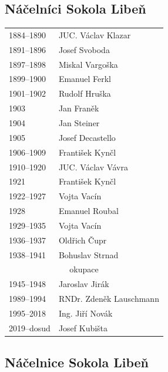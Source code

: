 \documentclass[a5paper, 11pt, twoside]{article}
\begin{document}
\clearpage
\raggedcolumns
\begin{multicols}{2}
\subsection*{Náčelníci Sokola Libeň}

\begin{tabular}[]{l >{\raggedright\arraybackslash}p{3cm}}
1884--1890 &  JUC. Václav Klazar \\
1891--1896 &  Josef Svoboda \\
1897--1898 &  Miskal Vargoška \\
1899--1900 &  Emanuel Ferkl \\
1901--1902 &  Rudolf Hruška \\
1903 & Jan Franěk \\
1904 & Jan Steiner \\
1905 & Josef Decastello \\
1906--1909 &  František Kynčl \\
1910--1920 &  JUC. Václav Vávra \\
1921 & František Kynčl \\
1922--1927 &  Vojta Vacín \\
1928 & Emanuel Roubal \\
1929--1935 &  Vojta Vacín \\
1936--1937 &  Oldřich Čupr \\
1938--1941 &  Bohuslav Strnad \\[6pt]
\multicolumn{2}{c}{okupace} \\[6pt]
1945--1948 &  Jaroslav Jirák \\
1989--1994 &  RNDr. Zdeněk Lauschmann \\
1995--2018 &  Ing. Jiří Novák \\
2019--dosud &  Josef Kubišta \\
\end{tabular}

\subsection*{Náčelnice Sokola Libeň}


\end{multicols}
\end{document}
